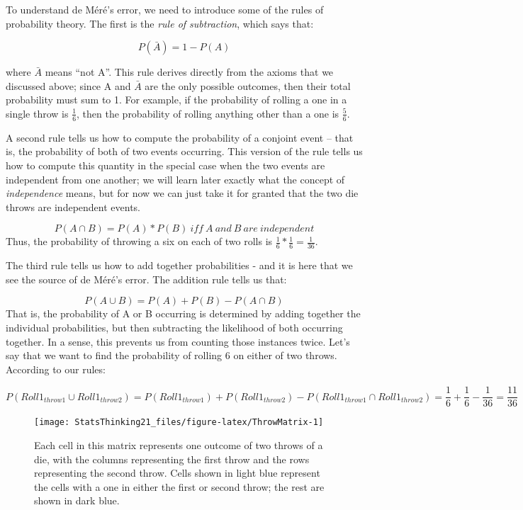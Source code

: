 \documentclass[]{book}
\theoremstyle{definition}
\theoremstyle{definition}
\theoremstyle{definition}
\theoremstyle{remark}
\begin{document}
To understand de Méré's error, we need to introduce some of the rules of
probability theory. The first is the \emph{rule of subtraction}, which
says that:

\[
P(\bar{A}) = 1 - P(A)
\]

where \(\bar{A}\) means ``not A''. This rule derives directly from the
axioms that we discussed above; since A and \(\bar{A}\) are the only
possible outcomes, then their total probability must sum to 1. For
example, if the probability of rolling a one in a single throw is
\(\frac{1}{6}\), then the probability of rolling anything other than a
one is \(\frac{5}{6}\).

A second rule tells us how to compute the probability of a conjoint
event -- that is, the probability of both of two events occurring. This
version of the rule tells us how to compute this quantity in the special
case when the two events are independent from one another; we will learn
later exactly what the concept of \emph{independence} means, but for now
we can just take it for granted that the two die throws are independent
events.

\[
P(A \cap B) = P(A) * P(B)\ iff\ A\ and\ B\ are\ independent
\] Thus, the probability of throwing a six on each of two rolls is
\(\frac{1}{6}*\frac{1}{6}=\frac{1}{36}\).

The third rule tells us how to add together probabilities - and it is
here that we see the source of de Méré's error. The addition rule tells
us that:

\[
P(A \cup B) = P(A) + P(B) - P(A \cap B)
\] That is, the probability of A or B occurring is determined by adding
together the individual probabilities, but then subtracting the
likelihood of both occurring together. In a sense, this prevents us from
counting those instances twice. Let's say that we want to find the
probability of rolling 6 on either of two throws. According to our
rules:

\[
P(Roll1_{throw1} \cup Roll1_{throw2}) = P(Roll1_{throw1}) + P(Roll1_{throw2}) - P(Roll1_{throw1} \cap Roll1_{throw2}) = \frac{1}{6} + \frac{1}{6} - \frac{1}{36} = \frac{11}{36}
\]

\begin{figure}
\texttt{[image: StatsThinking21\_files/figure-latex/ThrowMatrix-1]} \caption{Each cell in this matrix represents one outcome of two throws of a die, with the columns representing the first throw and the rows representing the second throw. Cells shown in light blue represent the cells with a one in either the first or second throw; the rest are shown in dark blue.}\label{fig:ThrowMatrix}
\end{figure}
\end{document}
